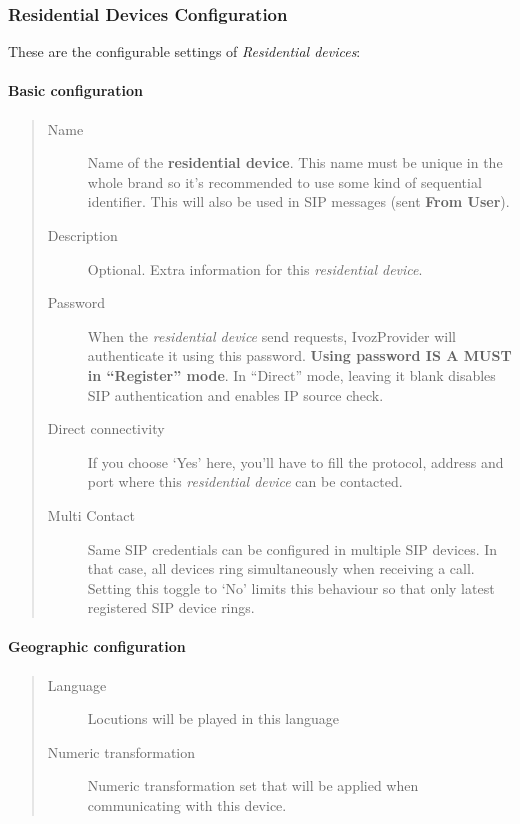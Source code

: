 \documentclass[letterpaper,10pt,english]{sphinxmanual}
\begin{document}
\subsubsection{Residential Devices Configuration}
\label{administration_portal/client/residential/residential_devices:residential-devices-configuration}
These are the configurable settings of \emph{Residential devices}:


\paragraph{Basic configuration}
\label{administration_portal/client/residential/residential_devices:basic-configuration}\begin{quote}
\begin{description}
\item[{Name}] \leavevmode
Name of the \textbf{residential device}. This name must be unique in the whole brand so
it's recommended to use some kind of sequential identifier. This will also be used
in SIP messages (sent \textbf{From User}).

\item[{Description}] \leavevmode
Optional. Extra information for this \emph{residential device}.

\item[{Password}] \leavevmode
When the \emph{residential device} send requests, IvozProvider will authenticate it using
this password. \textbf{Using password IS A MUST in ``Register'' mode}. In ``Direct'' mode,
leaving it blank disables SIP authentication and enables IP source check.

\item[{Direct connectivity}] \leavevmode
If you choose `Yes' here, you'll have to fill the protocol, address and
port where this \emph{residential device} can be contacted.

\item[{Multi Contact}] \leavevmode
Same SIP credentials can be configured in multiple SIP devices. In that case, all devices ring
simultaneously when receiving a call. Setting this toggle to `No' limits this behaviour so that
only latest registered SIP device rings.

\end{description}
\end{quote}


\paragraph{Geographic configuration}
\label{administration_portal/client/residential/residential_devices:geographic-configuration}\begin{quote}
\begin{description}
\item[{Language}] \leavevmode
Locutions will be played in this language

\item[{Numeric transformation}] \leavevmode
Numeric transformation set that will be applied when communicating with this device.

\end{description}
\end{quote}
\end{document}

